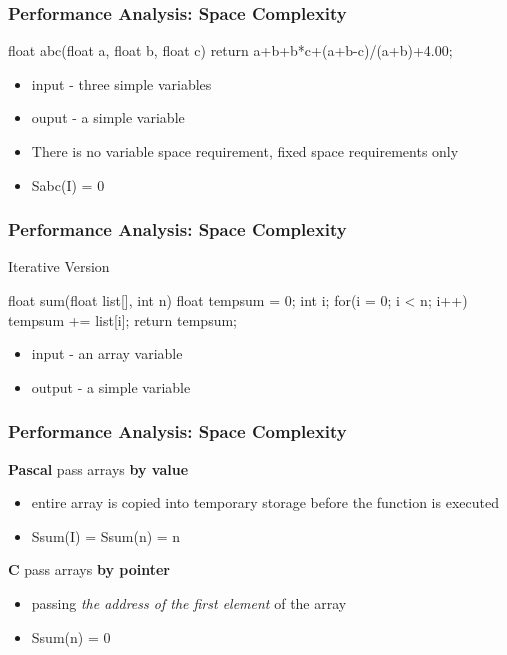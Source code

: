 \documentclass[newPxFont,sthlmFooter,nooffset]{beamer}
\begin{document}
\begin{frame}[t, fragile]
  \frametitle{Performance Analysis: Space Complexity}
\begin{codedef}
float abc(float a, float b, float c) { 
   return a+b+b*c+(a+b-c)/(a+b)+4.00;
}    
\end{codedef}
\begin{itemize}
\item input - three simple variables
\item ouput - a simple variable
\item There is no variable space requirement, fixed space requirements only
\item Sabc(I) = 0
\end{itemize}

\end{frame}

\begin{frame}[t, fragile]
  \frametitle{Performance Analysis: Space Complexity}
Iterative Version
\begin{codedef}
float sum(float list[], int n) { 
   float tempsum = 0;
   int i;
   for(i = 0; i < n; i++)
      tempsum += list[i];
      return tempsum;
}
\end{codedef}
\begin{itemize}
\item input - an array variable
\item output - a simple variable
\end{itemize}
\end{frame}

\begin{frame}[t]
  \frametitle{Performance Analysis: Space Complexity}
\textbf{Pascal} pass arrays \textbf{by value}
\begin{itemize}
\item entire array is copied into temporary storage before the
  function is executed
\item Ssum(I) = Ssum(n) = n
\end{itemize}

\textbf{C} pass arrays \textbf{by pointer}
\begin{itemize}
\item passing \textit{the address of the first element} of the array
\item Ssum(n) = 0
\end{itemize}

\end{frame}
\end{document}
